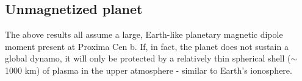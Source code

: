\documentclass{emulateapj}
\newcommand{\XXX}[1]{#1}      %
\newcommand{\xxx}[1]{{\color{red} #1}} %
\begin{document}

\subsection{Unmagnetized planet}
\label{sec:unmagnetized}

\XXX{The above results all assume a large, Earth-like planetary magnetic dipole moment present at Proxima Cen b. If, in fact, the planet does not sustain a global dynamo, it will only be protected by a relatively thin spherical shell ($\sim$1000 km) of plasma in the upper atmosphere - similar to Earth's ionosphere.}
\end{document}
